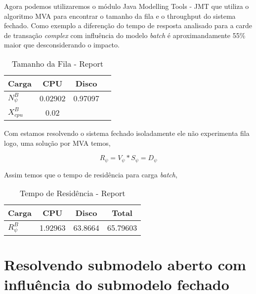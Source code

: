 \documentclass[11pt,a4paper]{abntex2}
\begin{document}
Agora podemos utilizaremos o módulo Java Modelling Tools - JMT que utiliza o algoritmo MVA para encontrar o tamanho da fila e o throughput do sistema fechado. Como exemplo a diferenção do tempo de resposta analisado para a carde de transação \textit{complex} com influência do modelo \textit{batch} é aproximandamente 55\% maior que desconsiderando o impacto. 


\begin{table}[htbp]
	\centering
	\caption{Tamanho da Fila -  Report} 
	\begin{tabular}{lccc}
		\toprule
		Carga       & CPU    & Disco \\
		\midrule
		$N^{B}_{\psi}$ & 0.02902 & 0.97097\\[3pt]
		$X^{B}_{cpu}$ & 0.02    &   \\[3pt]
		\bottomrule
	\end{tabular}%
	\label{tab:addlabel}%
\end{table}%

Com estamos resolvendo o sistema fechado isoladamente ele não experimenta fila logo, uma solução por MVA  temos,

\begin{equation}
R_{\psi} = V_{\psi}*S_{\psi} = D_{\psi}
\end{equation}

Assim temos que o tempo de residência para carga \textit{batch},

\begin{table}[htbp]
	\centering
	\caption{Tempo de Residência -  Report} 
	\begin{tabular}{lccc}
		\toprule
		Carga       & CPU    & Disco & Total \\
		\midrule
		$R^{B}_{\psi}$ & 1.92963 & 63.8664 & 65.79603 \\[3pt]
		\bottomrule
	\end{tabular}%
	\label{tab:TR_b}%
\end{table}%




\section*{\textbf{Resolvendo submodelo aberto com influência do submodelo fechado}}
\end{document}
